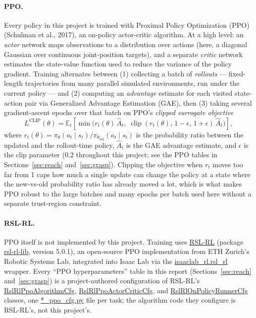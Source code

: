 \documentclass[11pt]{article}
\begin{document}
\paragraph{PPO.} Every policy in this project is trained with Proximal Policy
Optimization (PPO) (Schulman et al., 2017), an on-policy actor-critic algorithm. At
a high level: an \emph{actor} network maps observations to a distribution over
actions (here, a diagonal Gaussian over continuous joint-position targets), and a
separate \emph{critic} network estimates the state-value function used to reduce
the variance of the policy gradient. Training alternates between (1) collecting a
batch of \emph{rollouts} --- fixed-length trajectories from many parallel simulated
environments, run under the current policy --- and (2) computing an
\emph{advantage} estimate for each visited state-action pair via Generalized
Advantage Estimation (GAE), then (3) taking several gradient-ascent epochs over
that batch on PPO's \emph{clipped surrogate objective}
\[
L^{\text{CLIP}}(\theta) = \mathbb{E}_t\!\left[\min\!\big(r_t(\theta)\,\hat{A}_t,\;
\operatorname{clip}(r_t(\theta),\,1-\epsilon,\,1+\epsilon)\,\hat{A}_t\big)\right],
\]
where $r_t(\theta) = \pi_\theta(a_t\mid s_t) / \pi_{\theta_{\text{old}}}(a_t\mid s_t)$
is the probability ratio between the updated and the rollout-time policy, $\hat A_t$
is the GAE advantage estimate, and $\epsilon$ is the clip parameter (0.2 throughout
this project; see the PPO tables in Sections~\ref{sec:reach} and~\ref{sec:grasp}).
Clipping the objective when $r_t$ moves too far from 1 caps how much a single update
can change the policy at a state where the new-vs-old probability ratio has already
moved a lot, which is what makes PPO robust to the large batches and many epochs per
batch used here without a separate trust-region constraint.

\paragraph{RSL-RL.} PPO itself is not implemented by this project. Training uses
\href{https://github.com/leggedrobotics/rsl_rl}{RSL-RL}
(package \url{rsl-rl-lib}, version 5.0.1), an open-source PPO implementation from
ETH Zurich's Robotic Systems Lab, integrated into Isaac Lab via the
\url{isaaclab_rl.rsl_rl} wrapper. Every ``PPO hyperparameters'' table in this
report (Sections~\ref{sec:reach} and~\ref{sec:grasp}) is a project-authored
configuration of RSL-RL's \url{RslRlPpoAlgorithmCfg}, \url{RslRlPpoActorCriticCfg},
and \url{RslRlOnPolicyRunnerCfg} classes, one \url{*_ppo_cfg.py} file per
task; the algorithm code they configure is RSL-RL's, not this project's.
\end{document}

